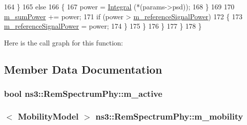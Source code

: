 \begin{DoxyCode}
164                 \}
165               \textcolor{keywordflow}{else}
166                 \{
167                   power = \hyperlink{namespacens3_a3dd3817567502f8bc77b04e47134c070}{Integral} (*(params->psd));
168                 \}
169 
170               \hyperlink{classns3_1_1RemSpectrumPhy_aa04c880a3c709f7125e1817845818517}{m\_sumPower} += power;
171               \textcolor{keywordflow}{if} (power > \hyperlink{classns3_1_1RemSpectrumPhy_a122a4b069be17e97c1df646a9d4f4506}{m\_referenceSignalPower})
172                 \{
173                   \hyperlink{classns3_1_1RemSpectrumPhy_a122a4b069be17e97c1df646a9d4f4506}{m\_referenceSignalPower} = power;
174                 \}
175             \}
176         \}
177     \}
178 \}
\end{DoxyCode}


Here is the call graph for this function\+:




\subsection{Member Data Documentation}
\subsubsection[{\texorpdfstring{m\+\_\+active}{m_active}}]{\setlength{\rightskip}{0pt plus 5cm}bool ns3\+::\+Rem\+Spectrum\+Phy\+::m\+\_\+active\hspace{0.3cm}{\ttfamily [private]}}\hypertarget{classns3_1_1RemSpectrumPhy_aaf04013201d8b634bdd992d6982f4415}{}\label{classns3_1_1RemSpectrumPhy_aaf04013201d8b634bdd992d6982f4415}
\subsubsection[{\texorpdfstring{m\+\_\+mobility}{m_mobility}}]{$<$ {\bf Mobility\+Model} $>$ ns3\+::\+Rem\+Spectrum\+Phy\+::m\+\_\+mobility\hspace{0.3cm}{\ttfamily [private]}}\hypertarget{classns3_1_1RemSpectrumPhy_a3a74c7c0804db4dbd441b7ba8d54772d}{}\label{classns3_1_1RemSpectrumPhy_a3a74c7c0804db4dbd441b7ba8d54772d}
